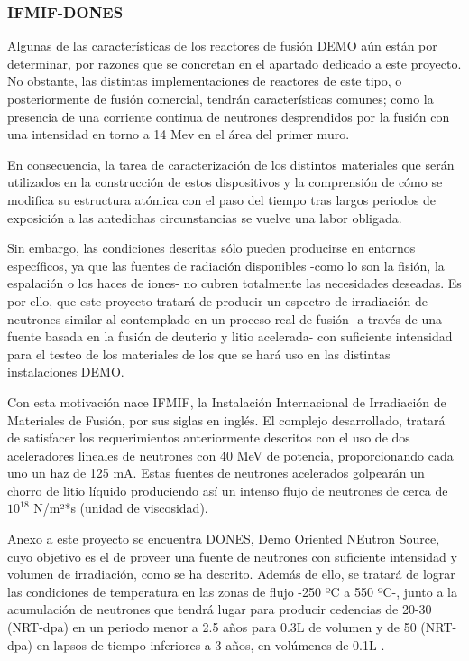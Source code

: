 \subsubsection{ IFMIF-DONES}
Algunas de las características de los reactores de fusión DEMO aún están por determinar, por razones que se concretan en el apartado dedicado a este proyecto. No obstante, las distintas implementaciones de reactores de este tipo, o posteriormente de fusión comercial, tendrán características comunes; como la presencia de una corriente continua de neutrones desprendidos por la fusión con una intensidad en torno a 14 Mev en el área del primer muro.

En consecuencia, la tarea de caracterización de los distintos materiales que serán utilizados en la construcción de estos dispositivos y la comprensión de cómo se modifica su estructura atómica con el paso del tiempo tras largos periodos de exposición a las antedichas circunstancias se vuelve una labor obligada.

Sin embargo, las condiciones descritas sólo pueden producirse en entornos específicos, ya que las fuentes de radiación disponibles -como lo son la fisión,  la espalación o los haces de iones- no cubren totalmente las necesidades deseadas. Es por ello, que este proyecto tratará de producir un espectro de irradiación de neutrones similar al contemplado en un proceso real de fusión -a través de una fuente basada en la fusión de deuterio y litio acelerada- con suficiente intensidad para el testeo de los materiales de los que se hará uso en las distintas instalaciones DEMO.

Con esta motivación nace IFMIF, la Instalación Internacional de Irradiación de  Materiales de  Fusión, por sus siglas en inglés. El complejo desarrollado, tratará de satisfacer los requerimientos anteriormente descritos con el uso de dos aceleradores lineales de neutrones con 40 MeV de potencia, proporcionando cada uno un haz de 125 mA. Estas fuentes de neutrones acelerados golpearán un chorro de litio líquido produciendo así un intenso flujo de neutrones de cerca de $10^{18}$ N/m²*s (unidad de viscosidad).

Anexo a este proyecto se encuentra DONES, Demo Oriented NEutron Source, cuyo objetivo es el de proveer una fuente de neutrones con suficiente intensidad y volumen de irradiación, como se ha descrito. Además de ello, se tratará de lograr las condiciones de temperatura en las zonas de flujo -250 ºC a 550 ºC-, junto a la acumulación de neutrones que tendrá lugar para producir cedencias de 20-30 (NRT-dpa) en un periodo menor a 2.5 años para 0.3L de volumen y de 50 (NRT-dpa) en lapsos de tiempo inferiores a 3 años, en volúmenes de 0.1L \cite{46}.


